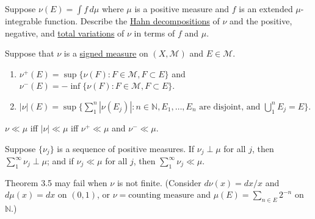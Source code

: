 	\begin{exercise}[Folland 3.6]
		Suppose $\nu(E) = \int f \, d\mu$ where $\mu$ is a positive measure and $f$ is an extended $\mu$-integrable function. Describe the \hyperref[thm:hahn-decomposition-theorem]{Hahn decompositions} of $\nu$ and the positive, negative, and \hyperref[def:total-variation]{total variations} of $\nu$ in terms of $f$ and $\mu$.
	\end{exercise}
	\begin{solution}

	\end{solution}

	\begin{exercise}[Folland 3.7]
		Suppose that $\nu$ is a \hyperref[def:signed-measure]{signed measure} on $(X, \mathcal{M})$ and $E \in \mathcal{M}$.
		\begin{enumerate}[label=\textbf{\alph*.}]
			\item $\nu^+(E) = \sup\{\nu(F) : F \in \mathcal{M}, F \subset E\}$ and $\nu^-(E) = -\inf\{\nu(F) : F \in \mathcal{M}, F \subset E\}$.
			\item $|\nu|(E) = \sup\{\sum_1^n |\nu(E_j)| : n \in \mathbb{N}, E_1, \dots, E_n \text{ are disjoint, and } \bigcup_1^n E_j = E\}$.
		\end{enumerate}
	\end{exercise}
	\begin{solution}

	\end{solution}

	\begin{exercise}[Folland 3.8]
		$\nu \ll \mu$ iff $|\nu| \ll \mu$ iff $\nu^+ \ll \mu$ and $\nu^- \ll \mu$.
	\end{exercise}
	\begin{solution}

	\end{solution}

	\begin{exercise}[Folland 3.9]
		Suppose $\{\nu_j\}$ is a sequence of positive measures. If $\nu_j \perp \mu$ for all $j$, then $\sum_1^\infty \nu_j \perp \mu$; and if $\nu_j \ll \mu$ for all $j$, then $\sum_1^\infty \nu_j \ll \mu$.
	\end{exercise}
	\begin{solution}

	\end{solution}

	\begin{exercise}[Folland 3.10]
		Theorem 3.5 may fail when $\nu$ is not finite. (Consider $d\nu(x) = dx/x$ and $d\mu(x) = dx$ on $(0, 1)$, or $\nu = \text{counting measure}$ and $\mu(E) = \sum_{n \in E} 2^{-n}$ on $\mathbb{N}$.)
	\end{exercise}
	\begin{solution}

	\end{solution}

